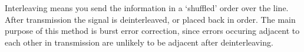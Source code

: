 \documentclass[11pt,titlepage]{report}
\begin{document}
Interleaving means you send the information in a `shuffled' order over the line. After transmission the signal is deinterleaved, or placed back in order. The main purpose of this method is burst error correction, since errors occuring adjacent to each other in transmission are unlikely to be adjacent after deinterleaving.
\end{document}
